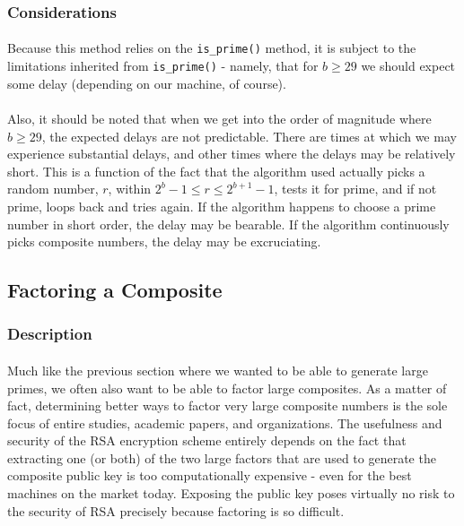 \documentclass[12pt,a4paper]{article}
\begin{document}
\subsubsection{Considerations}
\paragraph{}
Because this method relies on the \verb|is_prime()| method, it is subject to 
the limitations inherited from \verb|is_prime()| - namely, that for 
$b \ge 29$ we should 
expect some delay (depending on our machine, of course).  

\paragraph{}
Also, it should be 
noted that when we get into the order of magnitude where $b \ge 29$, the 
expected delays are not predictable.  There are times at which we may 
experience substantial delays, and other times where the delays may be 
relatively short.  This is a function of the fact that the algorithm used 
actually picks a random number, $r$, within $2^b - 1 \le r \le 2^{b+1} - 1$, 
tests it for 
prime, and if not prime, loops back and tries again.  If the algorithm happens 
to choose a prime number in short order, the delay may be bearable.  If the 
algorithm continuously picks composite numbers, the delay may be excruciating.


\subsection{Factoring a Composite}
\subsubsection{Description}
\paragraph{}
Much like the previous section where we wanted to be able to generate large 
primes, we often also want to be able to factor large composites.  As a matter 
of fact, determining better ways to factor very large composite numbers is the sole focus of 
entire studies, academic papers, and organizations.  The usefulness and 
security of the RSA encryption scheme entirely depends on the fact that 
extracting one (or both) of the two large factors that are used to generate 
the composite public key is too computationally expensive - even for the best 
machines on the market today.  Exposing the public key poses virtually no risk 
to the security of RSA precisely because factoring is so difficult.
\end{document}
